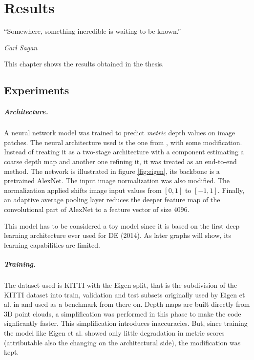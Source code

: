 \chapter{Results}
\label{c:results}

\epigraph{\enquote{Somewhere, something incredible is waiting to be known.}}{\emph{Carl Sagan}}

This chapter shows the results obtained in the thesis.

\section{Experiments}
\label{sec:experiments}

\paragraph{Architecture.}
A neural network model was trained to predict \textit{metric} depth values on image patches.
The neural architecture used is the one from \cite{Eigen}, with some modification.
Instead of treating it as a two-stage architecture with a component estimating a coarse depth map and another one refining it, it was treated as an end-to-end method.
The network is illustrated in figure \ref{fig:eigen}, its backbone is a pretrained AlexNet.
The input image normalization was also modified.
The normalization applied shifts image input values from $[0, 1]$ to $[-1, 1]$.
Finally, an adaptive average pooling layer reduces the deeper feature map of the convolutional part of AlexNet to a feature vector of size 4096.

This model has to be considered a toy model since it is based on the first deep learning architecture ever used for DE (2014).
As later graphs will show, its learning capabilities are limited.

\paragraph{Training.}
The dataset used is KITTI \cite{KITTI} with the Eigen split, that is the subdivision of the KITTI dataset into train, validation and test subsets originally used by Eigen et al. in \cite{Eigen} and used as a benchmark from there on.
Depth maps are built directly from 3D point clouds, a simplification was performed in this phase to make the code signficantly faster.
This simplification introduces inaccuracies.
But, since training the model like Eigen et al. showed only little degradation in metric scores (attributable also the changing on the architectural side), the modification was kept.


